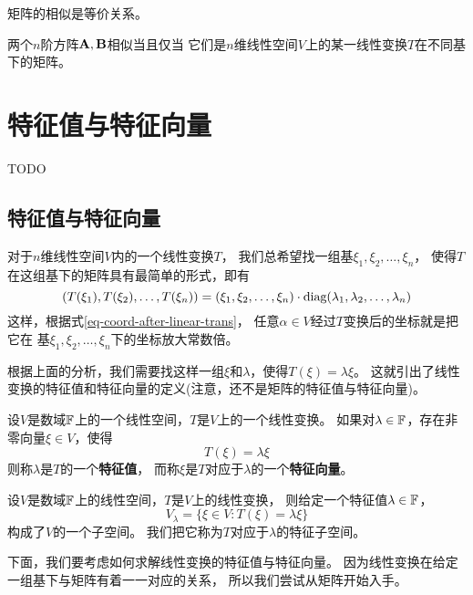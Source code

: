 \begin{remark}
  矩阵的相似是等价关系。
\end{remark}

\begin{theorem}[矩阵相似的等价条件]
  两个$n$阶方阵$\mathbf{A},\mathbf{B}$相似当且仅当
  它们是$n$维线性空间$V$上的某一线性变换$T$在不同基下的矩阵。
\end{theorem}

\section{特征值与特征向量}
TODO
\subsection{特征值与特征向量}
对于$n$维线性空间$V$内的一个线性变换$T$，
我们总希望找一组基$\xi_1,\xi_2,\dots,\xi_n$，
使得$T$在这组基下的矩阵具有最简单的形式，即有
\begin{displaymath}
  (T(\xi_1), T(\xi_2),\dots,T(\xi_n)) = (\xi_1,\xi_2,\dots,\xi_n)
    \cdot \textrm{diag}(\lambda_1,\lambda_2,\dots,\lambda_n)
\end{displaymath}
这样，根据式\ref{eq-coord-after-linear-trans}，
任意$\alpha\in V$经过$T$变换后的坐标就是把它在
基$\xi_1,\xi_2,\dots,\xi_n$下的坐标放大常数倍。

根据上面的分析，我们需要找这样一组$\xi$和$\lambda$，使得$T(\xi) = \lambda\xi$。
这就引出了线性变换的特征值和特征向量的定义(注意，还不是矩阵的特征值与特征向量)。

\begin{definition}[线性变换的特征值和特征向量]
  设$V$是数域$\mathbb{F}$上的一个线性空间，$T$是$V$上的一个线性变换。
  如果对$\lambda\in\mathbb{F}$，存在非零向量$\xi\in V$，使得
  \[ T(\xi) = \lambda\xi \]
  则称$\lambda$是$T$的一个\textbf{特征值}，
  而称$\xi$是$T$对应于$\lambda$的一个\textbf{特征向量}。
\end{definition}

\begin{theorem}[特征子空间]
  设$V$是数域$\mathbb{F}$上的线性空间，$T$是$V$上的线性变换，
  则给定一个特征值$\lambda\in\mathbb{F}$，
  \begin{displaymath}
    V_\lambda = \{ \xi\in V: T(\xi)=\lambda\xi \}
  \end{displaymath}
  构成了$V$的一个子空间。
  我们把它称为$T$对应于$\lambda$的特征子空间。
\end{theorem}

下面，我们要考虑如何求解线性变换的特征值与特征向量。
因为线性变换在给定一组基下与矩阵有着一一对应的关系，
所以我们尝试从矩阵开始入手。

